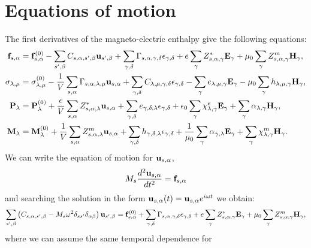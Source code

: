 \documentclass[12pt,a4paper]{article}
\begin{document}
\section{\color{coral}Equations of motion}
The first derivatives of the magneto-electric enthalpy give the following equations:
\begin{align}
{\bf f}_{s,\alpha}&= {\bf f}^{(0)}_{s,\alpha}
-\sum_{s',\beta} C_{s,\alpha,s',\beta} {\bf u}_{s',\beta}
+\sum_{\gamma,\delta}
\Gamma_{s,\alpha,\gamma,\delta} 
\epsilon_{\gamma,\delta} +
e \sum_{\gamma} Z^*_{s,\alpha,\gamma} {\bf E}_{\gamma}
+\mu_0 \sum_{\gamma} 
Z^m_{s,\alpha,\gamma} {\bf H}_{\gamma}, \\
\sigma_{\lambda,\mu}&= \sigma_{\lambda,\mu}^{(0)}
-{1\over V} \sum_{s,\alpha}
\Gamma_{s,\alpha,\lambda,\mu} {\bf u}_{s,\alpha}
+\sum_{\gamma,\delta} C_{\lambda,\mu,\gamma,\delta}  
\epsilon_{\gamma,\delta} -
\sum_{\gamma} e_{\lambda,\mu,\gamma} 
 {\bf E}_{\gamma}
-\mu_0 \sum_{\gamma}  h_{\lambda,\mu,\gamma} 
{\bf H}_{\gamma}, \\
{\bf P}_{\lambda}&= {\bf P}^{(0)}_{\lambda}
+{e\over V} \sum_{s,\alpha} Z^*_{s,\alpha,\lambda} 
{\bf u}_{s,\alpha} +
\sum_{\gamma,\delta} e_{\gamma,\delta,\lambda} 
\epsilon_{\gamma,\delta} +
\epsilon_0 \sum_{\gamma} 
\chi^e_{\lambda,\gamma}
{\bf E}_{\gamma} +
\sum_{\gamma} \alpha_{\lambda,\gamma} 
{\bf H}_{\gamma}, \\
{\bf M}_{\lambda}&= {\bf M}^{(0)}_{\lambda}
+{1\over V}\sum_{s,\alpha} 
Z^m_{s,\alpha,\lambda} {\bf u}_{s,\alpha} +
\sum_{\gamma,\delta}  h_{\gamma,\delta,\lambda} 
\epsilon_{\gamma,\delta} 
+{1\over \mu_0} \sum_{\gamma} \alpha_{\gamma,\lambda} {\bf E}_{\gamma}
+\sum_{\gamma} 
\chi^m_{\lambda,\gamma}
{\bf H}_{\gamma}.
\end{align}
We can write the equation of motion for ${\bf u}_{s,\alpha}$, 
\begin{equation}
M_s {d^2 {\bf u}_{s,\alpha} \over d t^2} = {\bf f}_{s,\alpha}
\end{equation}
and searching the solution in the form ${\bf u}_{s,\alpha}(t)=
{\bf u}_{s,\alpha} e^{i\omega t}$ we obtain:
\begin{equation}
\sum_{s',\beta} \left(C_{s,\alpha,s',\beta} - 
M_s \omega^2 \delta_{ss'}\delta_{\alpha\beta}\right)
{\bf u}_{s',\beta}= {\bf f}^{(0)}_{s,\alpha} + \sum_{\gamma,\delta} 
\Gamma_{s,\alpha,\gamma,\delta} \epsilon_{\gamma,\delta}
+ e \sum_{\gamma} Z^*_{s,\alpha,\gamma} {\bf E}_{\gamma} 
+ \mu_0 \sum_{\gamma} Z^m_{s,\alpha,\gamma} 
{\bf H}_{\gamma},
\end{equation}
where we can assume the same temporal dependence for 
\end{document}
